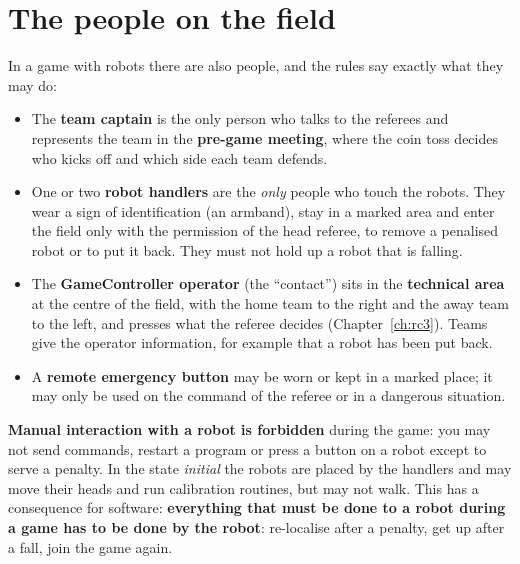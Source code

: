 \section*{The people on the field}
In a game with robots there are also people, and the rules say exactly what they may do:
\begin{itemize}[nosep]
 \item The \textbf{team captain} is the only person who talks to the referees and represents the team in the \textbf{pre-game meeting}, where the coin toss decides who kicks off and which side each team defends.
 \item One or two \textbf{robot handlers} are the \emph{only} people who touch the robots. They wear a sign of identification (an armband), stay in a marked area and enter the field only with the permission of the head referee, to remove a penalised robot or to put it back. They must not hold up a robot that is falling.
 \item The \textbf{GameController operator} (the ``contact'') sits in the \textbf{technical area} at the centre of the field, with the home team to the right and the away team to the left, and presses what the referee decides (Chapter~\ref{ch:rc3}). Teams give the operator information, for example that a robot has been put back.
 \item A \textbf{remote emergency button} may be worn or kept in a marked place; it may only be used on the command of the referee or in a dangerous situation.
\end{itemize}
\textbf{Manual interaction with a robot is forbidden} during the game: you may not send commands, restart a program or press a button on a robot except to serve a penalty. In the state \emph{initial} the robots are placed by the handlers and may move their heads and run calibration routines, but may not walk. This has a consequence for software: \textbf{everything that must be done to a robot during a game has to be done by the robot}: re-localise after a penalty, get up after a fall, join the game again.

\begin{center}
\end{center}

